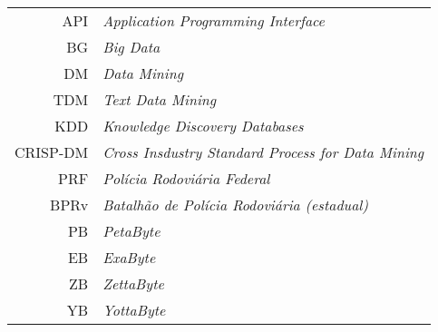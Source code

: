 \vspace*{12pt}

\noindent

\vspace{1em}

\begin{tabular}{r  l}
 API & \textit{Application Programming Interface}\\
 BG & \textit{Big Data}\\
 DM & \textit{Data Mining}\\
 TDM & \textit{Text Data Mining}\\
 KDD & \textit{Knowledge Discovery Databases}\\
 CRISP-DM & \textit{Cross Insdustry Standard Process for Data Mining}\\
 PRF & \textit{Polícia Rodoviária Federal}\\
 BPRv & \textit{Batalhão de Polícia Rodoviária (estadual)}\\ 

 PB & \textit{PetaByte}\\
 EB & \textit{ExaByte}\\
 ZB & \textit{ZettaByte}\\
 YB & \textit{YottaByte}\\
 
\end{tabular}


